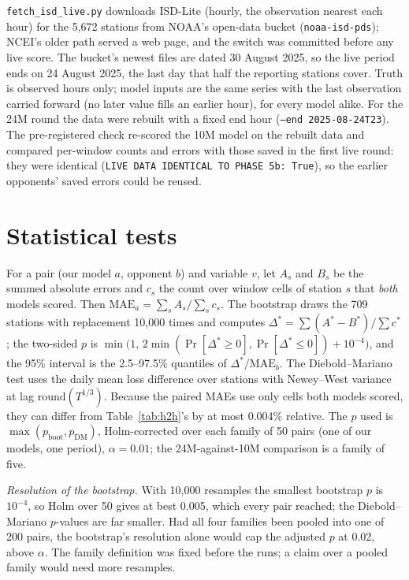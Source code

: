 \documentclass{article}
\begin{document}
\texttt{fetch\_isd\_live.py} downloads ISD-Lite (hourly, the observation nearest each hour) for the 5,672 stations from
NOAA's open-data bucket (\texttt{noaa-isd-pds}); NCEI's older path served a web page, and the switch was committed before
any live score. The bucket's newest files are dated 30 August 2025, so the live period ends on 24 August 2025, the last
day that half the reporting stations cover. Truth is observed hours only; model inputs are the same series with the last
observation carried forward (no later value fills an earlier hour), for every model alike. For the 24M round the data
were rebuilt with a fixed end hour (\texttt{--end 2025-08-24T23}). The pre-registered check re-scored the 10M model on
the rebuilt data and compared per-window counts and errors with those saved in the first live round: they were
identical (\texttt{LIVE DATA IDENTICAL TO PHASE 5b: True}), so the earlier opponents' saved errors could be reused.

\section{Statistical tests}
\label{app:stats}

For a pair (our model $a$, opponent $b$) and variable $v$, let $A_s$ and $B_s$ be the summed absolute errors and $c_s$
the count over window cells of station $s$ that \emph{both} models scored. Then $\mathrm{MAE}_a=\sum_s A_s/\sum_s c_s$.
The bootstrap draws the 709 stations with replacement 10,000 times and computes
$\Delta^{*}=\sum (A^{*}-B^{*})/\sum c^{*}$; the two-sided $p$ is
$\min\!\big(1,\,2\min(\Pr[\Delta^{*}\ge0],\Pr[\Delta^{*}\le0])+10^{-4}\big)$, and the 95\% interval is the 2.5--97.5\%
quantiles of $\Delta^{*}/\mathrm{MAE}_b$. The Diebold--Mariano test uses the daily mean loss difference over stations
with Newey--West variance at lag $\mathrm{round}(T^{1/3})$. Because the paired MAEs use only cells both models scored,
they can differ from Table~\ref{tab:h2h}'s by at most 0.004\% relative. The $p$ used is $\max(p_{\text{boot}},p_{\text{DM}})$,
Holm-corrected over each family of 50 pairs (one of our models, one period), $\alpha=0.01$; the 24M-against-10M
comparison is a family of five.

\emph{Resolution of the bootstrap.} With 10,000 resamples the smallest bootstrap $p$ is $10^{-4}$, so Holm over 50 gives
at best 0.005, which every pair reached; the Diebold--Mariano $p$-values are far smaller. Had all four families been
pooled into one of 200 pairs, the bootstrap's resolution alone would cap the adjusted $p$ at 0.02, above $\alpha$. The
family definition was fixed before the runs; a claim over a pooled family would need more resamples.
\end{document}
